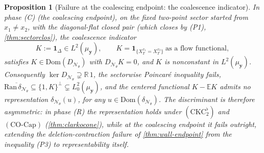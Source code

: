 \documentclass[reqno,final,11pt]{amsart}
\theoremstyle{plain}
\newtheorem{proposition}[theorem]{Proposition}
\theoremstyle{definition}
\theoremstyle{remark}
\newcommand{\R}{\mathbb R}
\newcommand{\E}{\mathbb E}
\newcommand{\Dom}{\mathrm{Dom}}
\newcommand{\cN}{\mathcal N}
\newcommand{\DN}{D_{\cN_\theta}}
\newcommand{\divN}{\delta_{\cN_\theta}}
\newcommand{\COcap}{(\mathrm{CO\text{-}Cap})}
\newcommand{\Ltwoz}{L^2_0}
\begin{document}
\begin{proposition}[Failure at the coalescing endpoint: the coalescence indicator]\label{prop:co-failure}
In phase \textnormal{(C)} (the coalescing endpoint), on the fixed two-point
sector started from $x_1\neq x_2$, with the diagonal-flat closed pair (which
closes by \textnormal{(P1)}, \cref{thm:sectorclos}), the coalescence indicator
\[
  K:=\mathbf 1_{\Delta}\in L^2(\mu_{\mathbf y}),
  \qquad K=\mathbf 1_{\{X^{x_1}_T=X^{x_2}_T\}}\ \text{as a flow functional},
\]
satisfies $K\in\Dom(\DN)$ with $\DN K=0$, and $K$ is nonconstant in
$L^2(\mu_{\mathbf y})$. Consequently $\ker\DN\supsetneq\R\,1$, the sectorwise
Poincar\'e inequality fails, $\overline{\mathrm{Ran}\,\divN}\subseteq
\{1,K\}^{\perp}\subsetneq\Ltwoz(\mu_{\mathbf y})$, and the centered functional
$K-\E K$ admits no representation $\divN(u)$, for any
$u\in\Dom(\divN)$. The discriminant is therefore asymmetric: in phase
\textnormal{(R)} the representation holds under
$(\mathrm{CKC}_2^{\flat})$ and $\COcap$ (\cref{thm:clarkocone}), while at the
coalescing endpoint it fails outright, extending the
deletion-contraction failure of \cref{thm:wall-endpoint} from the inequality
\textnormal{(P3)} to representability itself.
\end{proposition}
\end{document}

